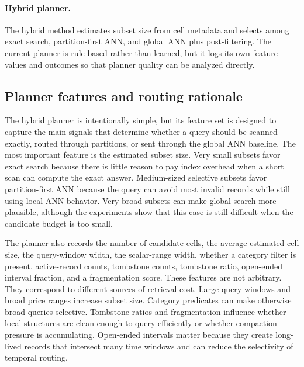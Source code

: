 \documentclass[sigconf,nonacm]{acmart}
\begin{document}
\paragraph{Hybrid planner.}
The hybrid method estimates subset size from cell metadata and selects among exact search, partition-first ANN, and global ANN plus post-filtering. The current planner is rule-based rather than learned, but it logs its own feature values and outcomes so that planner quality can be analyzed directly.

\subsection{Planner features and routing rationale}

The hybrid planner is intentionally simple, but its feature set is designed to capture the main signals that determine whether a query should be scanned exactly, routed through partitions, or sent through the global ANN baseline. The most important feature is the estimated subset size. Very small subsets favor exact search because there is little reason to pay index overhead when a short scan can compute the exact answer. Medium-sized selective subsets favor partition-first ANN because the query can avoid most invalid records while still using local ANN behavior. Very broad subsets can make global search more plausible, although the experiments show that this case is still difficult when the candidate budget is too small.

The planner also records the number of candidate cells, the average estimated cell size, the query-window width, the scalar-range width, whether a category filter is present, active-record counts, tombstone counts, tombstone ratio, open-ended interval fraction, and a fragmentation score. These features are not arbitrary. They correspond to different sources of retrieval cost. Large query windows and broad price ranges increase subset size. Category predicates can make otherwise broad queries selective. Tombstone ratios and fragmentation influence whether local structures are clean enough to query efficiently or whether compaction pressure is accumulating. Open-ended intervals matter because they create long-lived records that intersect many time windows and can reduce the selectivity of temporal routing.
\end{document}
